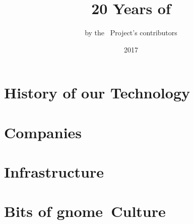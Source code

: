 \documentclass[11pt,letterpaper]{book}
\title{20 Years of \GNOME}
\author{by the \GNOME\ Project's contributors}
\date{2017}
\def\GNOME{{\sc gnome}}
\begin{document}
\maketitle
\tableofcontents





\part{History of our Technology}

















\part{Companies}












\part{Infrastructure}



\part{Bits of \GNOME\ Culture}




\printbibliography
\printglossaries
\printindex
\end{document}
